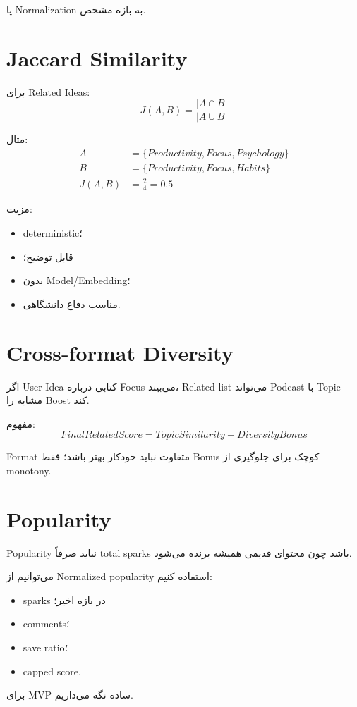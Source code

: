 یا Normalization به بازه مشخص.

\section{Jaccard Similarity}

برای Related Ideas:
\[
J(A,B)=\frac{|A\cap B|}{|A\cup B|}
\]

مثال:
\begin{align*}
A &= \{Productivity, Focus, Psychology\}\\
B &= \{Productivity, Focus, Habits\}\\
J(A,B) &= \frac{2}{4}=0.5
\end{align*}

مزیت:
\begin{itemize}
  \item deterministic؛
  \item قابل توضیح؛
  \item بدون Model/Embedding؛
  \item مناسب دفاع دانشگاهی.
\end{itemize}

\section{Cross-format Diversity}

اگر User Idea کتابی درباره Focus می‌بیند، Related list می‌تواند Podcast با Topic مشابه را Boost کند.

مفهوم:
\[
FinalRelatedScore = TopicSimilarity + DiversityBonus
\]

Format متفاوت نباید خودکار بهتر باشد؛ فقط Bonus کوچک برای جلوگیری از monotony.

\section{Popularity}

Popularity نباید صرفاً total sparks باشد چون محتوای قدیمی همیشه برنده می‌شود.

می‌توانیم از Normalized popularity استفاده کنیم:
\begin{itemize}
  \item sparks در بازه اخیر؛
  \item comments؛
  \item save ratio؛
  \item capped score.
\end{itemize}

برای MVP ساده نگه می‌داریم.

